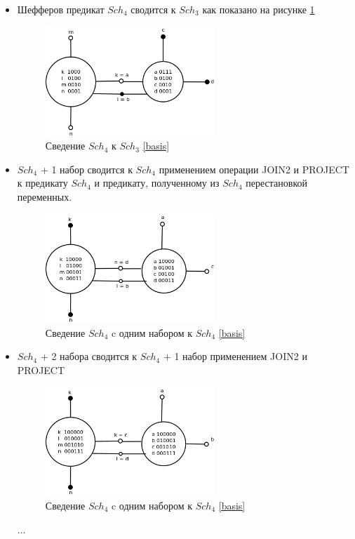 \documentclass[12pt]{article}
\begin{document}
\begin{itemize}
\item Шефферов предикат $Sch_4$ сводится к $Sch_3$ как показано на рисунке \ref{fig:4to3}
\begin{figure}[htb]
\centering
\includegraphics[width=0.6\textwidth]{4to3.png}
\caption{Сведение $Sch_4$ к $Sch_3$ \ref{basis}}
\label{fig:4to3}
\end{figure}

\item $Sch_4$ + 1 набор сводится к $Sch_4$ применением операции JOIN2 и PROJECT к предикату $Sch_4$ и предикату, 
полученному из $Sch_4$ перестановкой переменных. 
\begin{figure}[htb]
\centering
\includegraphics[width=0.6\textwidth]{4_1to4.png}
\caption{Сведение $Sch_4$ c одним набором к $Sch_4$ \ref{basis}}
\label{fig:4_1to4}
\end{figure}

\item $Sch_4$ + 2 набора сводится к $Sch_4$ + 1 набор применением JOIN2 и PROJECT
\begin{figure}[htb]
\centering
\includegraphics[width=0.6\textwidth]{4_2to4_1.png}
\caption{Сведение $Sch_4$ c одним набором к $Sch_4$ \ref{basis}}
\label{fig:4_2to4_1}
\end{figure}

$\ldots$

\end{itemize}
\end{document}
